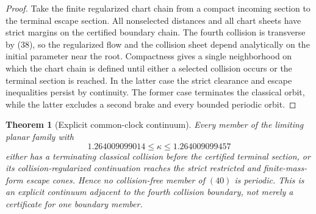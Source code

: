 \documentclass[11pt]{article}
\newtheorem{theorem}{Theorem}
\begin{document}
\begin{proof}
Take the finite regularized chart chain from a compact incoming section to
the terminal escape section.  All nonselected distances and all chart sheets
have strict margins on the certified boundary chain.  The fourth collision
is transverse by (38), so the regularized flow and the collision sheet depend
analytically on the initial parameter near the root.  Compactness gives a
single neighborhood on which the chart chain is defined until either a
selected collision occurs or the terminal section is reached.  In the latter
case the strict clearance and escape inequalities persist by continuity.
The former case terminates the classical orbit, while the latter excludes a
second brake and every bounded periodic orbit.
\end{proof}

\begin{theorem}[Explicit common-clock continuum]
Every member of the limiting planar family with
\[
 1.264009099014\leq\kappa\leq1.264009099457              \tag{40}
\]
either has a terminating classical collision before the certified terminal
section, or its collision-regularized continuation reaches the strict
restricted and finite-mass-form escape cones.  Hence no collision-free member
of \((40)\) is periodic.  This is an explicit continuum adjacent to the
fourth collision boundary, not merely a certificate for one boundary member.
\end{theorem}
\end{document}
